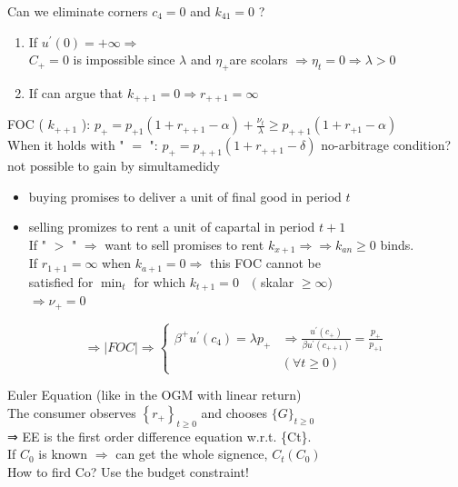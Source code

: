 \documentclass[10pt]{article}
\begin{document}
Can we eliminate corners $c_{4}=0$ and $k_{41}=0$ ?

\begin{enumerate}
  \item If $u^{\prime}(0)=+\infty \Rightarrow$\\
$C_{+}=0$ is impossible since $\lambda$ and $\eta_{+}$are scolars $\Rightarrow \eta_{t}=0 \Rightarrow \lambda>0$
  \item If can argue that $k_{++1}=0 \Rightarrow r_{++1}=\infty$
\end{enumerate}

FOC ( $k_{++1}$ ): $p_{+}=p_{+1}\left(1+r_{++1}-\alpha\right)+\frac{\nu_{t}}{\lambda} \geqslant p_{++1}\left(1+r_{+1}-\alpha\right)$\\
When it holds with " $=$ ": $p_{+}=p_{++1}\left(1+r_{++1}-\delta\right)$ no-arbitrage condition?\\
not possible to gain by simultamedidy

\begin{itemize}
  \item buying promises to deliver a unit of final good in period $t$
  \item selling promizes to rent a unit of capartal in period $t+1$\\
If " $>$ " $\Rightarrow$ want to sell promises to rent $k_{x+1} \Rightarrow \Rightarrow k_{a n} \geqslant 0$ binds.\\
If $r_{1+1}=\infty$ when $k_{a+1}=0 \Rightarrow$ this FOC cannot be\\
satisfied for $\min _{t}$ for which $k_{t+1}=0 \quad($ skalar $\geq \infty)$\\
$\Rightarrow \nu_{+}=0$
\end{itemize}

$$
\Rightarrow|F O C| \Rightarrow \begin{cases}\beta^{+} u^{\prime}\left(c_{4}\right)=\lambda p_{+} & \Rightarrow \frac{u^{\prime}\left(c_{+}\right)}{\beta u^{\prime}\left(c_{++1}\right)}=\frac{p_{+}}{p_{+1}} \\ & (\forall t \geq 0)\end{cases}
$$

Euler Equation (like in the OGM with linear return)\\
The consumer observes $\left\{r_{+}\right\}_{t \geq 0}$ and chooses $\{G\}_{t \geq 0}$\\
⇒ EE is the first order difference equation w.r.t. \{Ct\}.\\
If $C_{0}$ is known $\Rightarrow$ can get the whole signence, $C_{t}\left(C_{0}\right)$\\
How to fird Co? Use the budget constraint!
\end{document}
